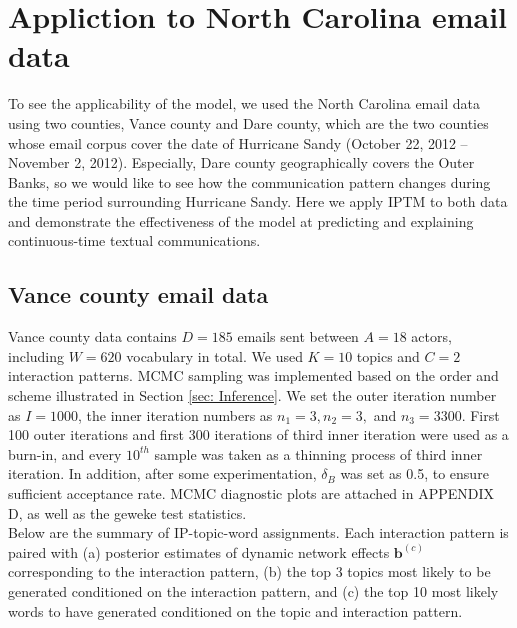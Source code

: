 \documentclass[a4paper]{article}
\begin{document}
 \section{Appliction to North Carolina email data}  \label{sec: Application to North Carolina email data}
 To see the applicability of the model, we used the North Carolina email data using two counties, Vance county and Dare county, which are the two counties whose email corpus cover the date of Hurricane Sandy (October 22, 2012 – November 2, 2012). Especially, Dare county geographically covers the Outer Banks, so we would like to see how the communication pattern changes during the time period surrounding Hurricane Sandy. Here we apply IPTM to both data and demonstrate the effectiveness of the model at predicting and explaining continuous-time textual communications.
 \subsection{Vance county email data} \label{subsec: Vance county email data}
Vance county data contains $D=185$ emails sent between $A=18$ actors, including $W=620$ vocabulary in total. We used $K=10$ topics and $C=2$ interaction patterns. MCMC sampling was implemented based on the order and scheme illustrated in Section \ref{sec: Inference}. We set the outer iteration number as $I=1000$, the inner iteration numbers as $n_1=3, n_2=3,$ and $n_3=3300$. First 100 outer iterations and first 300 iterations of third inner iteration were used as a burn-in, and every $10^{th}$ sample was taken as a thinning process of third inner iteration. In addition, after some experimentation, $\delta_B$ was set as 0.5, to ensure sufficient acceptance rate. MCMC diagnostic plots are attached in APPENDIX D, as well as the geweke test statistics. \\\newline
 Below are the summary of IP-topic-word assignments. Each interaction pattern is paired with (a) posterior estimates of dynamic network effects $\boldsymbol{b}^{(c)}$ corresponding to the interaction pattern, (b) the top 3 topics most likely to be generated conditioned on the interaction pattern, and (c) the top 10 most likely words to have generated conditioned on the topic and interaction pattern.
\end{document}
